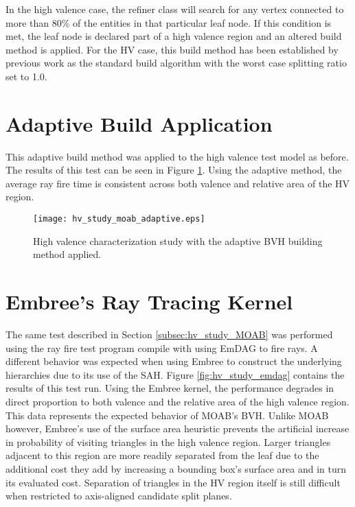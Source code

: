 In the high valence case, the refiner class will search for any vertex connected
to more than 80\% of the entities in that particular leaf node. If this condition
is met, the leaf node is declared part of a high valence region and an altered
build method is applied. For the HV case, this build method has been established
by previous work as the standard build algorithm with the worst case splitting
ratio set to 1.0.

\section{Adaptive Build Application}

This adaptive build method was applied to the high valence test model as
before. The results of this test can be seen in Figure
\ref{fig:hv_study_adaptive}. Using the adaptive method, the average ray fire
time is consistent across both valence and relative area of the HV region.

\begin{figure}
  \centering
  \texttt{[image: hv\_study\_moab\_adaptive.eps]}
  \caption{High valence characterization study with the adaptive BVH building method
    applied.}
  \label{fig:hv_study_adaptive}
\end{figure}



\section{Embree's Ray Tracing Kernel}\label{sec:emdag_hv_study}

The same test described in Section \ref{subsec:hv_study_MOAB} was performed
using the ray fire test program compile with using EmDAG to fire rays. A
different behavior was expected when using Embree to construct the underlying
hierarchies due to its use of the SAH. Figure \ref{fig:hv_study_emdag} contains
the results of this test run. Using the Embree kernel, the performance degrades
in direct proportion to both valence and the relative area of the high valence
region. This data represents the expected behavior of MOAB's BVH. Unlike MOAB
however, Embree's use of the surface area heuristic prevents the artificial
increase in probability of visiting triangles in the high valence region. Larger
triangles adjacent to this region are more readily separated from the leaf due
to the additional cost they add by increasing a bounding box's surface area and
in turn its evaluated cost. Separation of triangles in the HV region itself is
still difficult when restricted to axis-aligned candidate split planes.

